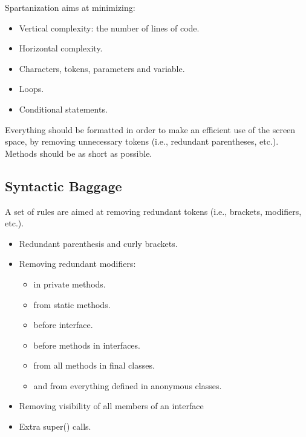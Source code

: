 Spartanization aims at minimizing:
\begin{itemize}
  \item Vertical complexity: the number of lines of code.
  \item Horizontal complexity.
  \item Characters, tokens, parameters and variable.
  \item Loops.
  \item Conditional statements.
\end{itemize}



Everything should be formatted in order to make an efficient use of the screen
space, by removing unnecessary tokens (i.e., redundant parentheses, etc.).
Methods should be as short as possible.

\subsection{Syntactic Baggage}
A set of rules are aimed at removing redundant tokens (i.e., brackets,
modifiers, etc.).
\begin{itemize}
  \item Redundant parenthesis and curly brackets.
  \item Removing redundant modifiers:
        \begin{itemize}
          \item {} in private methods.
          \item {} from static methods.
          \item {} before interface.
          \item {} before methods in interfaces.
          \item {} from all methods in final classes.
          \item {} and  from everything defined in
            anonymous classes.
        \end{itemize}
  \item Removing visibility of all members of an interface
  \item Extra super() calls.
\end{itemize}

